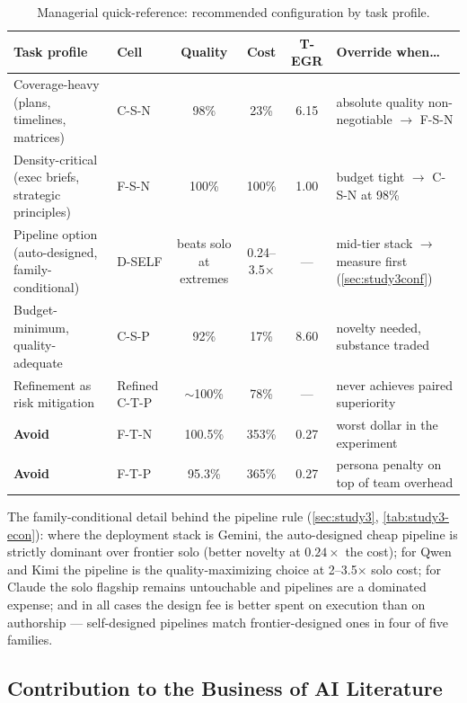 \documentclass[12pt,a4paper]{article}
\begin{document}
\begin{table}[ht]
  \centering
  \small
  \caption{Managerial quick-reference: recommended configuration by task profile.}
  \label{tab:managerial}
  \begin{tabularx}{\textwidth}{@{}>{\raggedright\arraybackslash}p{3.4cm} l ccc >{\raggedright\arraybackslash}X@{}}
    \toprule
    \textbf{Task profile} & \textbf{Cell} & \textbf{Quality} & \textbf{Cost} & \textbf{T-EGR} & \textbf{Override when\ldots} \\
    \midrule
    Coverage-heavy (plans, timelines, matrices)
      & C-S-N & 98\% & 23\% & 6.15
      & absolute quality non-negotiable $\to$ F-S-N \\
    Density-critical (exec briefs, strategic principles)
      & F-S-N & 100\% & 100\% & 1.00
      & budget tight $\to$ C-S-N at 98\% \\
    Pipeline option (auto-designed, family-conditional)
      & D-SELF & beats solo at extremes & 0.24--3.5$\times$ & ---
      & mid-tier stack $\to$ measure first (\cref{sec:study3conf}) \\
    Budget-minimum, quality-adequate
      & C-S-P & 92\% & 17\% & 8.60
      & novelty needed, substance traded \\
    Refinement as risk mitigation
      & Refined C-T-P & $\sim$100\% & 78\% & ---
      & never achieves paired superiority \\
    \textbf{Avoid}
      & F-T-N & 100.5\% & 353\% & 0.27
      & worst dollar in the experiment \\
    \textbf{Avoid}
      & F-T-P & 95.3\% & 365\% & 0.27
      & persona penalty on top of team overhead \\
    \bottomrule
  \end{tabularx}
\end{table}

The family-conditional detail behind the pipeline rule
(\cref{sec:study3}, \cref{tab:study3-econ}): where the deployment stack is
Gemini, the auto-designed cheap pipeline is strictly dominant over frontier
solo (better novelty at $0.24\times$ the cost); for Qwen and Kimi the pipeline
is the quality-maximizing choice at 2--3.5$\times$ solo cost; for Claude the
solo flagship remains untouchable and pipelines are a dominated expense; and in
all cases the design fee is better spent on execution than on authorship ---
self-designed pipelines match frontier-designed ones in four of five families.

\subsection{Contribution to the Business of AI Literature}
\end{document}
